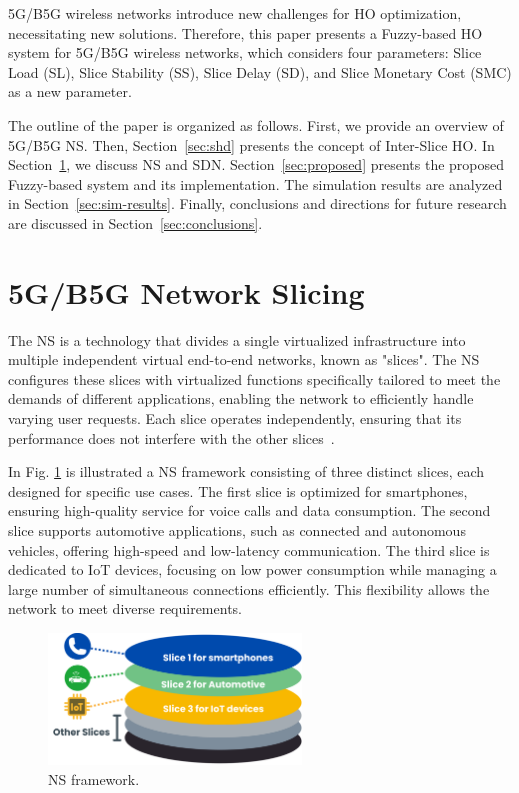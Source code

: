 \documentclass[graybox]{svmult}
\begin{document}
5G/B5G wireless networks introduce new challenges for HO optimization, necessitating new solutions. Therefore, this paper presents a Fuzzy-based HO system for 5G/B5G wireless networks, which considers four parameters: Slice Load (SL), Slice Stability (SS), Slice Delay (SD), and Slice Monetary Cost (SMC) as a new parameter.
 
The outline of the paper is organized as follows. First, we provide an overview of 5G/B5G NS. Then, Section~\ref{sec:shd} presents the concept of Inter-Slice HO. In Section~\ref{sec:nssdn}, we discuss NS and SDN. Section~\ref{sec:proposed} presents the proposed Fuzzy-based system and its implementation. The simulation results are analyzed in Section~\ref{sec:sim-results}. Finally, conclusions and directions for future research are discussed in Section~\ref{sec:conclusions}.


\section{5G/B5G Network Slicing}\label{sec:nssdn}
The NS is a technology that divides a single virtualized infrastructure into multiple independent virtual end-to-end networks, known as "slices". The NS configures these slices with virtualized functions specifically tailored to meet the demands of different applications, enabling the network to efficiently handle varying user requests. Each slice operates independently, ensuring that its performance does not interfere with the other slices~\cite{Namwon2019,jiang2016network,8858288}. 

In Fig. \ref{fig:NS} is illustrated a NS framework consisting of three distinct slices, each designed for specific use cases. The first slice is optimized for smartphones, ensuring high-quality service for voice calls and data consumption. The second slice supports automotive applications, such as connected and autonomous vehicles, offering high-speed and low-latency communication. The third slice is dedicated to IoT devices, focusing on low power consumption while managing a large number of simultaneous connections efficiently. This flexibility allows the network to meet diverse requirements.

\begin{figure}[H]\centering
	\includegraphics[width=0.6\textwidth]{figure/slices.png}
	\caption{NS framework.}\label{fig:NS}
\end{figure}
\end{document}
